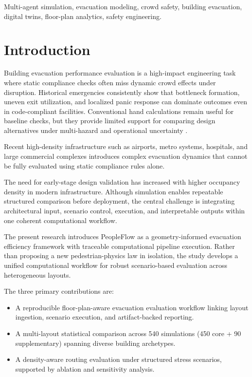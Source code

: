 \documentclass[journal]{IEEEtran}
\begin{document}
\begin{IEEEkeywords}
Multi-agent simulation, evacuation modeling, crowd safety, building evacuation, digital twins, floor-plan analytics, safety engineering.
\end{IEEEkeywords}

\section{Introduction}
Building evacuation performance evaluation is a high-impact engineering task where static compliance checks often miss dynamic crowd effects under disruption. Historical emergencies consistently show that bottleneck formation, uneven exit utilization, and localized panic response can dominate outcomes even in code-compliant facilities. Conventional hand calculations remain useful for baseline checks, but they provide limited support for comparing design alternatives under multi-hazard and operational uncertainty \cite{sfpe,evac_review}.

Recent high-density infrastructure such as airports, metro systems, hospitals, and large commercial complexes introduces complex evacuation dynamics that cannot be fully evaluated using static compliance rules alone.

The need for early-stage design validation has increased with higher occupancy density in modern infrastructure. Although simulation enables repeatable structured comparison before deployment, the central challenge is integrating architectural input, scenario control, execution, and interpretable outputs within one coherent computational workflow.

The present research introduces PeopleFlow as a geometry-informed evacuation efficiency framework with traceable computational pipeline execution. Rather than proposing a new pedestrian-physics law in isolation, the study develops a unified computational workflow for robust scenario-based evaluation across heterogeneous layouts.

The three primary contributions are:
\begin{itemize}
    \item A reproducible floor-plan-aware evacuation evaluation workflow linking layout ingestion, scenario execution, and artifact-backed reporting.
    \item A multi-layout statistical comparison across 540 simulations (450 core + 90 supplementary) spanning diverse building archetypes.
    \item A density-aware routing evaluation under structured stress scenarios, supported by ablation and sensitivity analysis.
\end{itemize}
\end{document}
